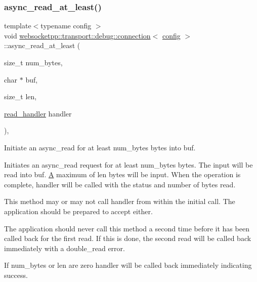 \subsubsection{\texorpdfstring{async\+\_\+read\+\_\+at\+\_\+least()}{async\_read\_at\_least()}}
{\footnotesize\ttfamily template$<$typename config $>$ \\
void \mbox{\hyperlink{classwebsocketpp_1_1transport_1_1debug_1_1connection}{websocketpp\+::transport\+::debug\+::connection}}$<$ \mbox{\hyperlink{classconfig}{config}} $>$\+::async\+\_\+read\+\_\+at\+\_\+least (\begin{DoxyParamCaption}\item[{size\+\_\+t}]{num\+\_\+bytes,  }\item[{char $\ast$}]{buf,  }\item[{size\+\_\+t}]{len,  }\item[{\mbox{\hyperlink{namespacewebsocketpp_1_1transport_a3a9b2ed54dfcc6ebe7d7e6b4c02f53fb}{read\+\_\+handler}}}]{handler }\end{DoxyParamCaption})\hspace{0.3cm}{\ttfamily [inline]}, {\ttfamily [protected]}}



Initiate an async\+\_\+read for at least num\+\_\+bytes bytes into buf. 

Initiates an async\+\_\+read request for at least num\+\_\+bytes bytes. The input will be read into buf. \mbox{\hyperlink{struct_a}{A}} maximum of len bytes will be input. When the operation is complete, handler will be called with the status and number of bytes read.

This method may or may not call handler from within the initial call. The application should be prepared to accept either.

The application should never call this method a second time before it has been called back for the first read. If this is done, the second read will be called back immediately with a double\+\_\+read error.

If num\+\_\+bytes or len are zero handler will be called back immediately indicating success.



